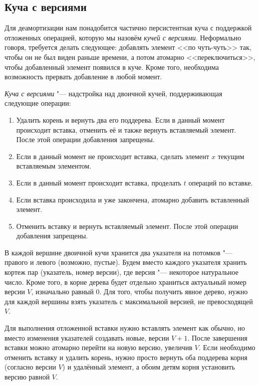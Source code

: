 \subsection{Куча с версиями} \label{heap-with-versions}
Для деамортизации нам понадобится частично персистентная куча с поддержкой
отложенных операцией, которую мы назовём \emph{кучей с версиями}.
Неформально говоря, требуется делать следующее: добавлять элемент <<по чуть-чуть>>
так, чтобы он не был виден раньше времени, а потом атомарно <<переключиться>>,
чтобы добавленный элемент появился в куче. Кроме того, необходима возможность
прервать добавление в любой момент.

\begin{definition}
\emph{Куча с версиями} "--- надстройка над двоичной кучей,
поддерживающая следующие операции:
\begin{enumerate}
\item Удалить корень и вернуть два его поддерева. Если в данный момент происходит
    вставка, отменить её и также вернуть вставляемый элемент. После этой операции
    добавления запрещены.
\item Если в данный момент не происходит вставка, сделать элемент $x$
    текущим вставляемым элементом.
\item Если в данный момент происходит вставка, проделать $t$ операций по вставке.
\item Если вставка происходила и уже закончена, атомарно добавить вставленный элемент.
\item Отменить вставку и вернуть вставляемый элемент. После этой операции
    добавления запрещены.
\end{enumerate}
\end{definition}

В каждой вершине двоичной кучи хранится два указателя на потомков "--- правого
и левого (возможно, пустые). Будем вместо каждого указателя хранить кортеж
пар (указатель, номер версии), где версия "--- некоторое натуральное число.
Кроме того, в корне дерева будет отдельно храниться актуальный номер версии $V$,
изначально равный $0$.
Для того, чтобы получить явное дерево, нужно для каждой вершины взять
указатель с максимальной версией, не превосходящей $V$.

Для выполнения отложенной вставки нужно вставлять элемент как обычно, но вместо
изменения указателей создавать новые, версии $V+1$. После завершения вставки
можно атомарно перейти на новую версию, увеличив $V$. Если необходимо отменить
вставку и удалить корень, нужно просто вернуть оба поддерева корня (согласно версии
$V$) и удалённый элемент, а обоим детям корня установить версию равной $V$.

